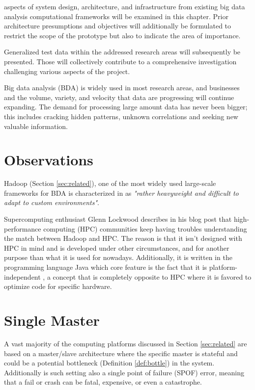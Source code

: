  aspects of system design, architecture, and infrastructure from existing big data analysis computational frameworks will be examined in this chapter. Prior architecture presumptions and objectives will additionally be formulated to restrict the scope of the prototype but also to indicate the area of importance. 

Generalized test data within the addressed research areas will subsequently be presented. Those will collectively contribute to a comprehensive investigation challenging various aspects of the project.
\newline

Big data analysis (BDA) is widely used in most research areas, and businesses and the volume, variety, and velocity that data are progressing will continue expanding. The demand for processing large amount data has never been bigger; this includes cracking hidden patterns, unknown correlations and seeking new valuable information.

\section{Observations}
Hadoop (Section \ref{sec:related}), one of the most widely used large-scale frameworks for BDA is characterized in \cite{Mundkur:2011:DCP:2034654.2034670} as \textit{"rather heavyweight and difficult to adapt to custom environments"}. 

Supercomputing enthusiast Glenn Lockwood describes in his blog post \cite{PageLockwoodHadoop} that high-performance computing (HPC) communities keep having troubles understanding the match between Hadoop and HPC. The reason is that it isn't designed with HPC in mind and is developed under other circumstances, and for another purpose than what it is used for nowadays. Additionally, it is written in the programming language Java which core feature is the fact that it is platform-independent \cite{PageJava}, a concept that is completely opposite to HPC where it is favored to optimize code for specific hardware.

\section{Single Master}
A vast majority of the computing platforms discussed in Section \ref{sec:related} are based on a master/slave architecture where the specific master is stateful and could be a potential bottleneck (Definition \ref{def:bottle}) in the system. Additionally is such setting also a single point of failure (SPOF) error, meaning that a fail or crash can be fatal, expensive, or even a catastrophe.
\newline

